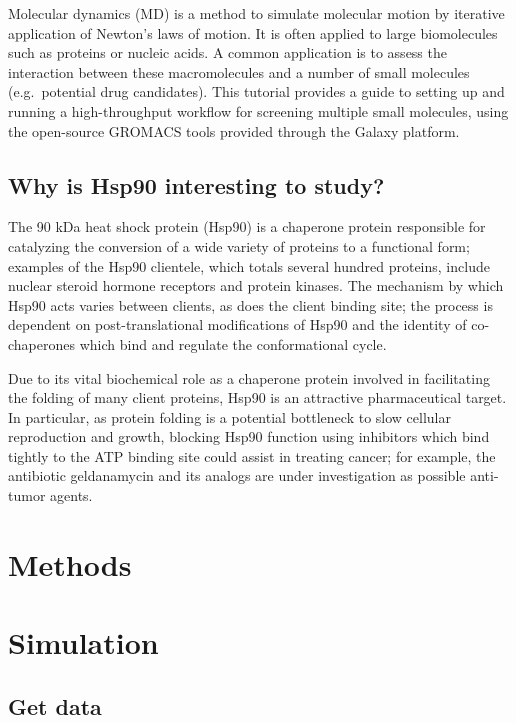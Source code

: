 \documentclass[twocolumn]{bmcart}%
\begin{document}
Molecular dynamics (MD) is a method to simulate molecular motion by
iterative application of Newton's laws of motion. It is often applied to
large biomolecules such as proteins or nucleic acids. A common
application is to assess the interaction between these macromolecules
and a number of small molecules (e.g.~potential drug candidates). This
tutorial provides a guide to setting up and running a high-throughput
workflow for screening multiple small molecules, using the open-source
GROMACS tools provided through the Galaxy platform.

\subsection*{Why is Hsp90 interesting to
study?}\label{why-is-hsp90-interesting-to-study}

The 90 kDa heat shock protein (Hsp90) is a chaperone protein responsible
for catalyzing the conversion of a wide variety of proteins to a
functional form; examples of the Hsp90 clientele, which totals several
hundred proteins, include nuclear steroid hormone receptors and protein
kinases. The mechanism by which Hsp90 acts varies between clients, as
does the client binding site; the process is dependent on
post-translational modifications of Hsp90 and the identity of
co-chaperones which bind and regulate the conformational cycle.

Due to its vital biochemical role as a chaperone protein involved in
facilitating the folding of many client proteins, Hsp90 is an attractive
pharmaceutical target. In particular, as protein folding is a potential
bottleneck to slow cellular reproduction and growth, blocking Hsp90
function using inhibitors which bind tightly to the ATP binding site
could assist in treating cancer; for example, the antibiotic
geldanamycin and its analogs are under investigation as possible
anti-tumor agents.



\hypertarget{methods}{%
\section*{Methods}\label{simulation}}
\hypertarget{simulation}{%
\section*{Simulation}\label{simulation}}

\subsection{Get data}\label{get-data}
\end{document}
